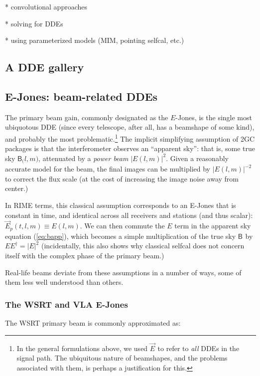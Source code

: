 \documentclass[]{aa}
\newcommand{\jones}[2]{\vec {#1}_{#2}}
\newcommand{\coh}[2]{\mathsf{{#1}}_{{#2}}}
\begin{document}
* convolutional approaches

* solving for DDEs

* using parameterized models (MIM, pointing selfcal, etc.)

\subsection{\label{sec:dde-examples}A DDE gallery}

\subsection{E-Jones: beam-related DDEs\label{sec:E-Jones}}

The primary beam gain, commonly designated as the $E$-Jones, is the single most ubiquotous DDE (since every telescope, after all, has a beamshape of some kind), and probably the most problematic.\footnote{In the general formulations above, we used $\jones{E}{}$ to refer to {\em all} DDEs in the signal path. The ubiquitous nature of beamshapes, and the problems associated with them, is perhaps a justification for this.} The implicit simplifying assumption of 2GC packages is that the interferometer observes an ``apparent sky'': that is, some true sky $\coh{B}(l,m)$, attenuated by a {\em power beam} $|E(l,m)|^2$. Given a reasonably accurate model for the beam, the final images can be multiplied by $|E(l,m)|^{-2}$ to correct the flux scale (at the cost of increasing the image noise away from center.)

In RIME terms, this classical assumption corresponds to an E-Jones that is constant in time, and identical across all receivers and stations (and thus scalar): $\jones{E}{p}(t,l,m) \equiv E(l,m)$. We can then commute the $E$ term in the apparent sky equation (\ref{eq:bapp}), which becomes
a simple multiplication of the true sky $\coh{B}{}$ by $EE^\dagger=|E|^2$ (incidentally, this also shows why classical selfcal does not concern itself with the complex phase of the primary beam.) 

Real-life beams deviate from these assumptions in a number of ways, some of them less well understood than others.

\subsubsection{The WSRT and VLA E-Jones\label{sec:E-Jones:wsrt}\label{sec:E-Jones:vla}}

The WSRT primary beam is commonly approximated as:
\end{document}
